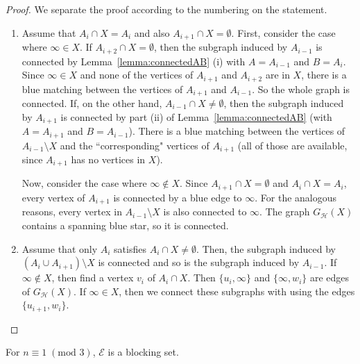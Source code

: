 \documentclass[11pt,a4paper]{article}
\begin{document}
\begin{proof}
We separate the proof according to the numbering on the statement.
\begin{enumerate}
    \item Assume that $A_i \cap X=A_i$ and also $A_{i+1}\cap X=\emptyset$. First, consider the case where $\infty \in X$. If $A_{i+2} \cap X = \emptyset$, then the subgraph induced by $A_{i-1}$ is connected by Lemma~\ref{lemma:connectedAB} (i) with $A=A_{i-1}$ and $B=A_i$. Since $\infty \in X$ and none of the vertices of $A_{i+1}$ and $A_{i+2}$ are in $X$, there is a blue matching between the vertices of $A_{i+1}$ and $A_{i-1}$. So the whole graph is connected. If, on the other hand, $A_{i-1} \cap X \neq \emptyset$, then the subgraph induced by $A_{i+1}$ is connected by part (ii) of Lemma~\ref{lemma:connectedAB} (with $A=A_{i+1}$ and $B=A_{i-1}$). There is a blue matching between the vertices of $A_{i-1}\setminus X$ and the ``corresponding" vertices of $A_{i+1}$ (all of those are available, since $A_{i+1}$ has no vertices in $X$).

    Now, consider the case where $\infty \notin X$. Since $A_{i+1} \cap X = \emptyset$ and $A_i\cap X=A_i$, every vertex of $A_{i+1}$ is connected by a blue edge to $\infty$. For the analogous reasons, every vertex in $A_{i-1} \setminus X$ is also connected to $\infty$. The graph $G_{\mathcal{H}} (X)$ contains a spanning blue star, so it is connected.


    \item Assume that only $A_i$ satisfies $A_i \cap X \neq \emptyset$. Then, the subgraph induced by $(A_i\cup A_{i+1})\setminus X$ is connected and so is the subgraph induced by $A_{i-1}$. If $\infty \notin X$, then find a vertex $v_i$ of $A_i \cap X$. Then $\{u_i, \infty\}$ and $\{ \infty, w_i \}$ are edges of $G_{\mathcal{H}}(X)$. If $\infty \in X$, then we connect these subgraphs with using the edges $\{ u_{i+1}, w_i \}$.
\end{enumerate}
\end{proof}

\begin{theorem}\label{theorem:main3k+1}
    For $n \equiv 1 \; ({\mbox{mod }} 3)$, $\mathcal{E}$ is a blocking set.
\end{theorem}
\end{document}
